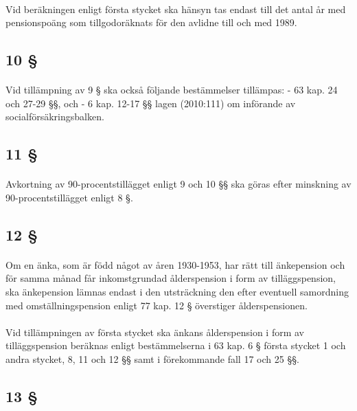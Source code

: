 \documentclass[a4paper,notitlepage,openany,10pt]{book}
\begin{document}
\paragraph*{}
Vid beräkningen enligt första stycket ska hänsyn tas endast till det antal år med pensionspoäng som tillgodoräknats för den avlidne till och med 1989.
\subsection*{10 §}
\paragraph*{}
Vid tillämpning av 9 § ska också följande bestämmelser tillämpas:
\newline - 63 kap. 24 och 27-29 §§, och
\newline - 6 kap. 12-17 §§ lagen (2010:111) om införande av socialförsäkringsbalken.
\subsection*{11 §}
\paragraph*{}
Avkortning av 90-procentstillägget enligt 9 och 10 §§ ska göras efter minskning av 90-procentstillägget enligt 8 §.
\subsection*{12 §}
\paragraph*{}
Om en änka, som är född något av åren 1930-1953, har rätt till änkepension och för samma månad får inkomstgrundad ålderspension i form av tilläggspension, ska änkepension lämnas endast i den utsträckning den efter eventuell samordning med omställningspension enligt 77 kap. 12 § överstiger ålderspensionen.
\paragraph*{}
Vid tillämpningen av första stycket ska änkans ålderspension i form av tilläggspension beräknas enligt bestämmelserna i 63 kap. 6 § första stycket 1 och andra stycket, 8, 11 och 12 §§ samt i förekommande fall 17 och 25 §§.
\subsection*{13 §}
\end{document}

